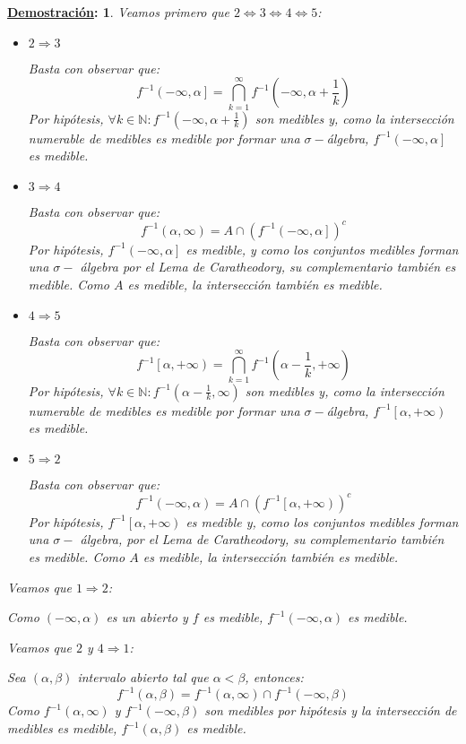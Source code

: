 \documentclass[10pt,a4paper,openright]{book}
\theoremstyle{break}
\newtheorem*{demo}{\underline{Demostración}:}
\begin{document}
\begin{demo}
Veamos primero que $2 \Leftrightarrow 3 \Leftrightarrow 4 \Leftrightarrow 5$: 
\begin{itemize}
    \item $2 \Rightarrow 3$
    
    Basta con observar que:
    $$f^{-1}\left( -\infty, \alpha \right] = \bigcap_{k=1}^\infty f^{-1}\left( -\infty, \alpha + \frac{1}{k} \right)$$
    Por hipótesis, $\forall k \in \mathbb{N}: f^{-1}\left( -\infty, \alpha + \frac{1}{k} \right)$ son medibles y, como la intersección numerable de medibles es medible por formar una $\sigma-$álgebra, $f^{-1}\left( -\infty, \alpha \right]$ es medible. 
    \item $3 \Rightarrow 4$
    
    Basta con observar que:
    $$f^{-1}\left( \alpha,  \infty \right) = A \cap \left(f^{-1}\left( -\infty, \alpha \right] \right)^c$$
    Por hipótesis, $f^{-1}\left( -\infty, \alpha \right] $ es medible, y como los conjuntos medibles forman una $\sigma -$ álgebra por el Lema de Caratheodory, su complementario también es medible. Como $A$ es medible, la intersección también es medible.
    \item $4 \Rightarrow 5$
    
    Basta con observar que:
    $$f^{-1}\left[ \alpha, +\infty \right) = \bigcap_{k=1}^\infty f^{-1}\left( \alpha - \frac{1}{k}, +\infty \right)$$
    Por hipótesis, $\forall k \in \mathbb{N} : f^{-1}\left( \alpha - \frac{1}{k}, \infty \right)$ son medibles y, como la intersección numerable de medibles es medible por formar una $\sigma-$álgebra, $f^{-1}\left[ \alpha, +\infty \right)$ es medible.
    \item $5 \Rightarrow 2$
    
    Basta con observar que:
    $$f^{-1}\left( -\infty,  \alpha \right) = A \cap \left(f^{-1}\left[ \alpha, +\infty \right) \right)^c$$
    Por hipótesis, $f^{-1}\left[ \alpha, +\infty \right) $ es medible y, como los conjuntos medibles forman una $\sigma -$ álgebra, por el Lema de Caratheodory, su complementario también es medible. Como $A$ es medible, la intersección también es medible.
\end{itemize}
Veamos que $1 \Rightarrow 2$:

Como $\left( -\infty, \alpha \right)$ es un abierto y $f$ es medible, $f^{-1}\left( -\infty, \alpha \right)$ es medible.

Veamos que $2$ y $4 \Rightarrow 1$:

Sea $\left( \alpha, \beta \right)$ intervalo abierto tal que $\alpha < \beta$, entonces:
$$f^{-1}\left( \alpha, \beta \right) = f^{-1}\left( \alpha, \infty \right) \cap f^{-1}\left( -\infty, \beta \right)$$
Como $f^{-1}\left( \alpha, \infty \right)$ y $f^{-1}\left( -\infty, \beta \right)$ son medibles por hipótesis y la intersección de medibles es medible, $f^{-1}\left( \alpha, \beta \right)$ es medible.
\end{demo}
\end{document}
